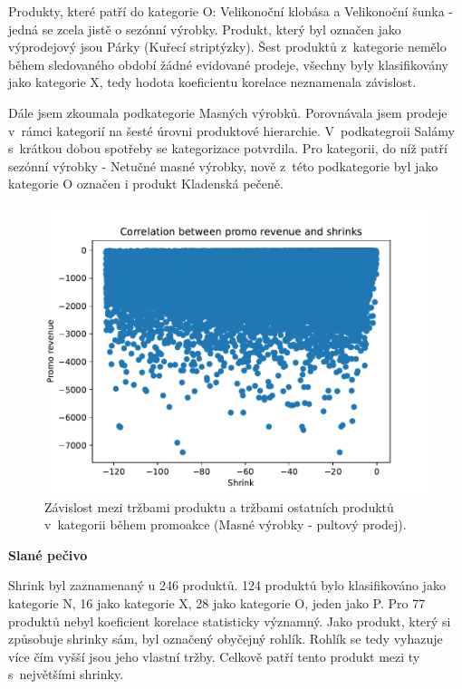 Produkty, které patří do kategorie O: Velikonoční klobása a Velikonoční šunka - jedná se zcela jistě o sezónní výrobky. Produkt, který byl označen jako výprodejový jsou Párky (Kuřecí striptýzky). Šest produktů z~kategorie nemělo během sledovaného období žádné evidované prodeje, všechny byly klasifikovány jako kategorie X, tedy hodota koeficientu korelace neznamenala závislost. %

Dále jsem zkoumala podkategorie Masných výrobků. Porovnávala jsem prodeje v~rámci kategorií na šesté úrovni produktové hierarchie. V~podkategroii Salámy s~krátkou dobou spotřeby se kategorizace potvrdila. Pro kategorii, do níž patří sezónní výrobky - Netučné masné výrobky, nově z~této podkategorie byl jako kategorie O označen i produkt Kladenská pečeně.

\begin{figure}[h!]
    \centering
    \captionsetup{justification=centering}
    \includegraphics[width=.8\textwidth]{obrazky/grafy/categorization_charts/categorization_charts_L4_PROC MEAT SERVICE.pdf}
    \caption{Závislost mezi tržbami produktu a tržbami ostatních produktů v~kategorii během promoakce (Masné výrobky - pultový prodej).}
    \label{obr:corr:maso}
\end{figure}

\textbf{Slané pečivo}

Shrink byl zaznamenaný u 246 produktů. 124 produktů bylo klasifikováno jako kategorie N, 16 jako kategorie X, 28 jako kategorie O, jeden jako P. Pro 77 produktů nebyl koeficient korelace statisticky významný. Jako produkt, který si způsobuje shrinky sám, byl označený obyčejný rohlík. Rohlík se tedy vyhazuje více čím vyšší jsou jeho vlastní tržby. Celkově patří tento produkt mezi ty s~největšími shrinky.

